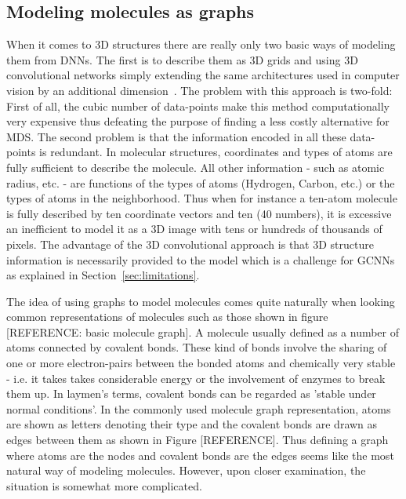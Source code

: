 \subsection{Modeling molecules as graphs}

When it comes to 3D structures there are really only two basic ways of modeling them from DNNs. The first is to describe them as 3D grids and using 3D convolutional networks simply extending the same architectures used in computer vision by an additional dimension~\cite{Wallach2015}. The problem with this approach is two-fold: First of all, the cubic number of data-points make this method computationally very expensive thus defeating the purpose of finding a less costly alternative for MDS. The second problem is that the information encoded in all these data-points is redundant. In molecular structures, coordinates and types of atoms are fully sufficient to describe the molecule. All other information - such as atomic radius, etc. - are functions of the types of atoms (Hydrogen, Carbon, etc.) or the types of atoms in the neighborhood. Thus when for instance a ten-atom molecule is fully described by ten coordinate vectors and ten (40 numbers), it is excessive an inefficient to model it as a 3D image with tens or hundreds of thousands of pixels. The advantage of the 3D convolutional approach is that 3D structure information is necessarily provided to the model which is a challenge for GCNNs as explained in Section~\ref{sec:limitations}.

The idea of using graphs to model molecules comes quite naturally when looking common representations of molecules such as those shown in figure [REFERENCE: basic molecule graph]. A molecule usually defined as a number of atoms connected by covalent bonds. These kind of bonds involve the sharing of one or more electron-pairs between the bonded atoms and chemically very stable - i.e. it takes takes considerable energy or the involvement of enzymes to break them up. In laymen's terms, covalent bonds can be regarded as 'stable under normal conditions'. In the commonly used molecule graph representation, atoms are shown as letters denoting their type and the covalent bonds are drawn as edges between them as shown in Figure [REFERENCE]. Thus defining a graph where atoms are the nodes and covalent bonds are the edges seems like the most natural way of modeling molecules. However, upon closer examination, the situation is somewhat more complicated.

